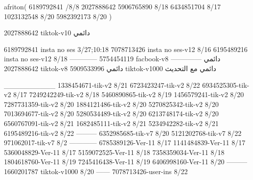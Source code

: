 afriton(
6189792841 /8/8
2027888642
5906765890 8/18
6434851704 8/17
1023132548 8/20
5982392173 8/20
)

2027888642 tiktok-v10
دائمي

6189792841 insta no ses
3/27;10:18
7078713426 insta no ses-v12
8/16
6195489216 insta no ses-v12
8/18
------------
5754454119 facbook-v8
دائمي
--------------
2027888642 tiktok-v8
دائمي
5909533996 tiktok-v1000
دائمي مع التحديث

__________
1338454671-tik-v2
8/21
6723423247-tik-v2
8/22
6934525305-tik-v2
8/17
7249242249-tik-v2
8/18
5460890865-tik-v2
8/19
1456579241-tik-v2
8/20
7287731359-tik-v2
8/20
1884121486-tik-v2
8/20
5270825342-tik-v2
8/20
7013694677-tik-v2
8/20
5280534489-tik-v2
8/20
6213748174-tik-v2
8/20
6560767091-tik-v2
8/21
1682485111-tik-v2
8/21
5234942282-tik-v2
8/21
6195489216-tik-v2
8/22
---------
6352985685-tik-v7
8/20
5121202768-tik-v7
8/22
971062017-tik-v7
8/2
------------
6785389126-Ver-11
8/17
1141484839-Ver-11
8/17
5360048829-Ver-11
8/17
5159072525-Ver-11
8/18
7358359034-Ver-11
8/18
1804618760-Ver-11
8/19
7245416438-Ver-11
8/19
6406998160-Ver-11
8/20
---------
1660201787 tiktok-v1000
8/20
------
7078713426-user-ins
8/22
